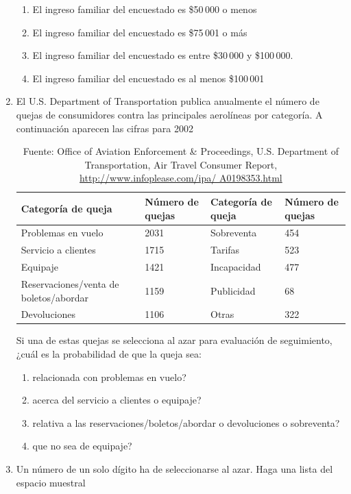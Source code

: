\documentclass[11pt,twoside]{article}
\begin{document}
\begin{enumerate}
\begin{enumerate}
 \item El ingreso familiar del encuestado es \$50\,000 o menos
 \item El ingreso familiar del encuestado es \$75\,001 o más
 \item El ingreso familiar del encuestado es entre \$30\,000 y \$100\,000.
 \item El ingreso familiar del encuestado es al menos \$100\,001
\end{enumerate}
\item El U.S. Department of Transportation publica
anualmente el número de quejas de consumidores
contra las principales aerolíneas por categoría. A continuación aparecen las cifras para 2002
\begin{table}[!h]
 \begin{center}
\begin{tabular}{p{3.5cm}p{2cm}|lp{2cm}}
Categoría de queja & Número de quejas & Categoría de queja & Número de quejas\\ \hline
Problemas en vuelo & 2031 & Sobreventa & 454\\
Servicio a clientes & 1715 & Tarifas & 523\\
Equipaje & 1421 & Incapacidad & 477\\
Reservaciones/venta de boletos/abordar & 1159 & Publicidad & 68\\
Devoluciones & 1106 & Otras & 322 \\ \hline
 \end{tabular}
 \end{center}
\caption{Fuente: Office of Aviation Enforcement \& Proceedings, U.S. Department of
Transportation, Air Travel Consumer Report, \url{http://www.infoplease.com/ipa/
A0198353.html}}
\end{table} 
Si una de estas quejas se selecciona al azar para evaluación de seguimiento, ¿cuál es la probabilidad de que la queja sea:
\begin{enumerate}
 \item relacionada con problemas en vuelo?
 \item acerca del servicio a clientes o equipaje?
 \item relativa a las reservaciones/boletos/abordar o devoluciones o sobreventa?
 \item que no sea de equipaje?
\end{enumerate}
\item Un número de un solo dígito ha de seleccionarse al azar. Haga una lista del espacio muestral

\end{enumerate}
\end{document}
